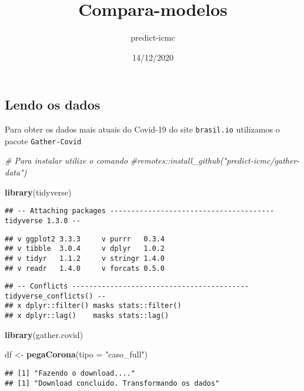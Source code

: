 \documentclass[
]{article}
\title{Compara-modelos}
\author{predict-icmc}
\date{14/12/2020}
\newenvironment{Shaded}{\begin{snugshade}}{\end{snugshade}}
\newcommand{\CommentTok}[1]{\textcolor[rgb]{0.56,0.35,0.01}{\textit{#1}}}
\newcommand{\DataTypeTok}[1]{\textcolor[rgb]{0.13,0.29,0.53}{#1}}
\newcommand{\KeywordTok}[1]{\textcolor[rgb]{0.13,0.29,0.53}{\textbf{#1}}}
\newcommand{\NormalTok}[1]{#1}
\newcommand{\StringTok}[1]{\textcolor[rgb]{0.31,0.60,0.02}{#1}}
\begin{document}
\maketitle

\hypertarget{lendo-os-dados}{%
\subsection{Lendo os dados}\label{lendo-os-dados}}

Para obter os dados mais atuais do Covid-19 do site \texttt{brasil.io}
utilizamos o pacote \texttt{Gather-Covid}

\begin{Shaded}
\begin{Highlighting}[]
\CommentTok{# Para instalar utilize o comando}
\CommentTok{#remotes::install_github("predict-icmc/gather-data")}

\KeywordTok{library}\NormalTok{(tidyverse)}
\end{Highlighting}
\end{Shaded}

\begin{verbatim}
## -- Attaching packages --------------------------------------- tidyverse 1.3.0 --
\end{verbatim}

\begin{verbatim}
## v ggplot2 3.3.3     v purrr   0.3.4
## v tibble  3.0.4     v dplyr   1.0.2
## v tidyr   1.1.2     v stringr 1.4.0
## v readr   1.4.0     v forcats 0.5.0
\end{verbatim}

\begin{verbatim}
## -- Conflicts ------------------------------------------ tidyverse_conflicts() --
## x dplyr::filter() masks stats::filter()
## x dplyr::lag()    masks stats::lag()
\end{verbatim}

\begin{Shaded}
\begin{Highlighting}[]
\KeywordTok{library}\NormalTok{(gather.covid)}

\NormalTok{df <-}\StringTok{ }\KeywordTok{pegaCorona}\NormalTok{(}\DataTypeTok{tipo =} \StringTok{"caso_full"}\NormalTok{)}
\end{Highlighting}
\end{Shaded}

\begin{verbatim}
## [1] "Fazendo o download...."
## [1] "Download concluido. Transformando os dados"
\end{verbatim}
\end{document}
